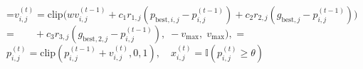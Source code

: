 \documentclass[final,5p,times,twocolumn]{elsarticle}
\begin{document}
\showthe\columnwidth
{}=\hbox{$\displaystyle v_{i,j}^{(t)} = \mathrm{clip}\bigl(w v_{i,j}^{(t-1)} + c_1 r_{1,j} (p_{\mathrm{best},i,j} - p_{i,j}^{(t-1)}) + c_2 r_{2,j} (g_{\mathrm{best},j} - p_{i,j}^{(t-1)})\bigr)$}
\showthe{}
=\hbox{$\displaystyle \qquad + c_3 r_{3,j} (g_{\mathrm{best},2,j} - p_{i,j}^{(t-1)}), \; -v_{\max}, \; v_{\max}\bigr),$}
\showthe{}
=\hbox{$\displaystyle p_{i,j}^{(t)} = \mathrm{clip}(p_{i,j}^{(t-1)} + v_{i,j}^{(t)}, 0, 1), \quad x_{i,j}^{(t)} = \mathbb{I}(p_{i,j}^{(t)} \ge \theta)$}
\showthe{}
\end{document}
